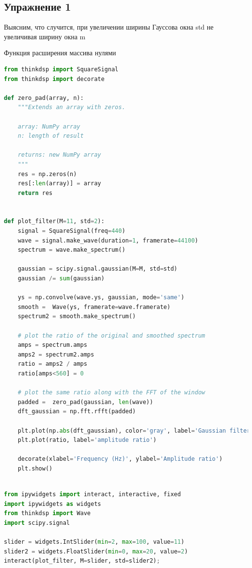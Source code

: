 \subsection{Упражнение 1}

Выясним, что случится, при увеличении ширины Гауссова окна std не увеличивая ширину окна m

Функция расширения массива нулями

\begin{lstlisting}[language=Python]
from thinkdsp import SquareSignal
from thinkdsp import decorate

def zero_pad(array, n):
    """Extends an array with zeros.

    array: NumPy array
    n: length of result

    returns: new NumPy array
    """
    res = np.zeros(n)
    res[:len(array)] = array
    return res


def plot_filter(M=11, std=2):
    signal = SquareSignal(freq=440)
    wave = signal.make_wave(duration=1, framerate=44100)
    spectrum = wave.make_spectrum()

    gaussian = scipy.signal.gaussian(M=M, std=std)
    gaussian /= sum(gaussian)

    ys = np.convolve(wave.ys, gaussian, mode='same')
    smooth =  Wave(ys, framerate=wave.framerate)
    spectrum2 = smooth.make_spectrum()

    # plot the ratio of the original and smoothed spectrum
    amps = spectrum.amps
    amps2 = spectrum2.amps
    ratio = amps2 / amps    
    ratio[amps<560] = 0

    # plot the same ratio along with the FFT of the window
    padded =  zero_pad(gaussian, len(wave))
    dft_gaussian = np.fft.rfft(padded)

    plt.plot(np.abs(dft_gaussian), color='gray', label='Gaussian filter')
    plt.plot(ratio, label='amplitude ratio')

    decorate(xlabel='Frequency (Hz)', ylabel='Amplitude ratio')
    plt.show()
    
\end{lstlisting}

\begin{lstlisting}[language=Python]
from ipywidgets import interact, interactive, fixed
import ipywidgets as widgets
from thinkdsp import Wave
import scipy.signal

slider = widgets.IntSlider(min=2, max=100, value=11)
slider2 = widgets.FloatSlider(min=0, max=20, value=2)
interact(plot_filter, M=slider, std=slider2);
\end{lstlisting}

